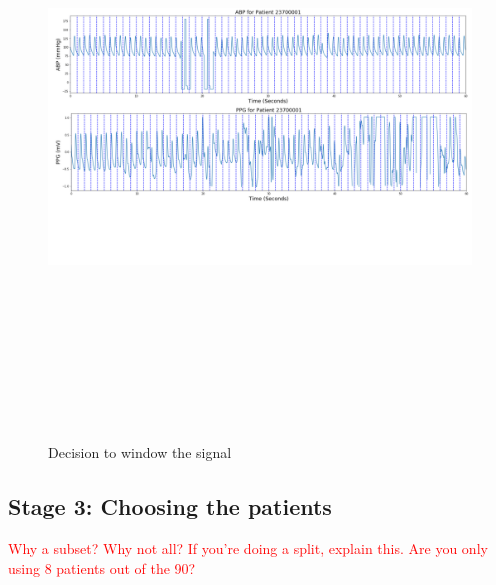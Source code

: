 \begin{figure}[H]
    \centering
    \includegraphics[width=16cm,height=16cm,keepaspectratio]{Implementation/window.png}
    \caption{Decision to window the signal}
    \label{windowing}
\end{figure}



\subsection{Stage 3: Choosing the patients}

\textcolor{red}{Why a subset? Why not all? If you're doing a split, explain this. Are you only using 8 patients out of the 90?}

